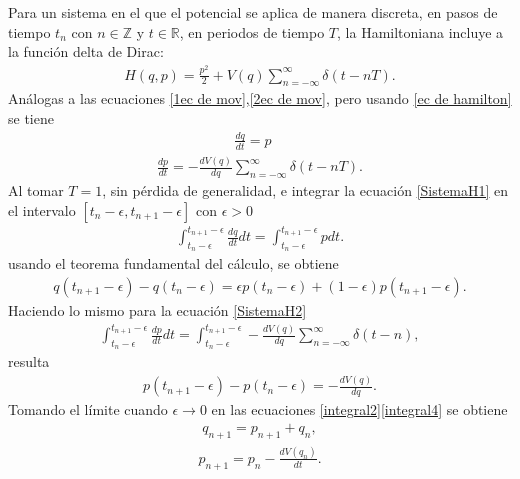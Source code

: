 Para un sistema en el que el potencial se aplica de manera discreta, en pasos de tiempo $t_{n}$ con $n\in\mathbb{Z}$ y $t\in\mathbb{R}$, en periodos de tiempo $T$, la Hamiltoniana incluye a la función delta de Dirac:
\begin{eqnarray}
H(q,p)=\frac{p^{2}}{2}+V(q)\sum_{n=-\infty}^{\infty}\delta(t-nT).
\label{ec de hamilton} 
\end{eqnarray}
Análogas a las ecuaciones \ref{1ec de mov},\ref{2ec de mov}, pero usando \ref{ec de hamilton} se tiene 
\begin{eqnarray}
\frac{dq}{dt}=p\quad
\label{SistemaH1}
\end{eqnarray}
\begin{eqnarray}
\frac{dp}{dt}=-\frac{dV(q)}{dq}\sum_{n=-\infty}^{\infty}\delta(t-nT).
\label{SistemaH2}
\end{eqnarray}
Al tomar $T=1$, sin pérdida de generalidad, e integrar la ecuación \eqref{SistemaH1} en el intervalo $[t_{n}-\epsilon,t_{n+1}-\epsilon]$ con $\epsilon>0$
\begin{eqnarray}
\int_{t_{n}-\epsilon}^{t_{n+1}-\epsilon}\frac{dq}{dt}dt=\int_{t_{n}-\epsilon}^{t_{n+1}-\epsilon}pdt.
\label{integral1}
\end{eqnarray}
usando el teorema fundamental del cálculo, se obtiene
\begin{eqnarray}
q(t_{n+1}-\epsilon)-q(t_{n}-\epsilon)=\epsilon p(t_{n}-\epsilon)+(1-\epsilon)p(t_{n+1}-\epsilon).
\label{integral2}
\end{eqnarray}
Haciendo lo mismo para la ecuación \eqref{SistemaH2}
\begin{eqnarray}
\int_{t_{n}-\epsilon}^{t_{n+1}-\epsilon}\frac{dp}{dt}dt=\int_{t_{n}-\epsilon}^{t_{n+1}-\epsilon}-\frac{dV(q)}{dq}\sum_{n=-\infty}^{\infty}\delta(t-n),
\label{integral3}
\end{eqnarray}
resulta
\begin{eqnarray}
p(t_{n+1}-\epsilon)-p(t_{n}-\epsilon)=-\frac{dV(q)}{dq}.
\label{integral4}
\end{eqnarray}
Tomando el límite cuando $\epsilon\rightarrow 0$ en las ecuaciones \eqref{integral2}\eqref{integral4} se obtiene
\begin{eqnarray}
q_{n+1}=p_{n+1}+q_{n},
\label{sistema hamilton a}
\end{eqnarray}
\begin{eqnarray}
p_{n+1}=p_{n}-\frac{dV(q_{n})}{dt}.
\label{sistema hamilton b}
\end{eqnarray}






